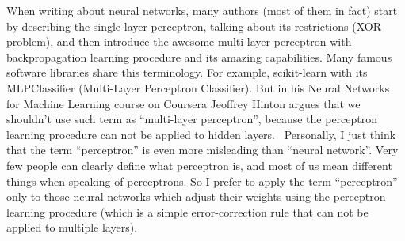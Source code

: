 When writing about neural networks, many authors (most of them in fact) start by describing the single-layer perceptron, talking about its restrictions (XOR problem), and then introduce the awesome multi-layer perceptron with backpropagation learning procedure and its amazing capabilities. Many famous software libraries share this terminology. For example, scikit-learn with its MLPClassifier (Multi-Layer Perceptron Classifier).
But in his Neural Networks for Machine Learning course on Coursera Jeoffrey Hinton argues that we shouldn’t use such term as “multi-layer perceptron”, because the perceptron learning procedure can not be applied to hidden layers. 
Personally, I just think that the term “perceptron” is even more misleading than “neural network”. Very few people can clearly define what perceptron is, and most of us mean different things when speaking of perceptrons. So I prefer to apply the term “perceptron” only to those neural networks which adjust their weights using the perceptron learning procedure (which is a simple error-correction rule that can not be applied to multiple layers).
